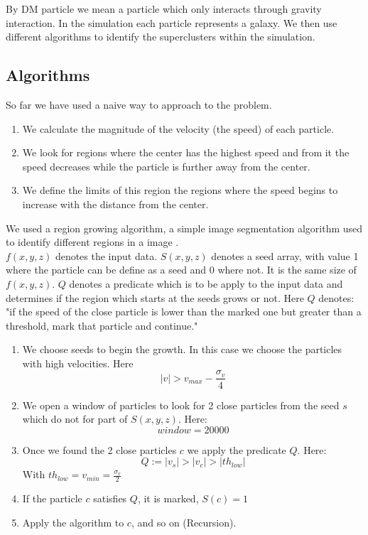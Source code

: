 \documentclass[12pt]{article}
\begin{document}
By DM particle we mean a particle which only interacts through gravity
interaction. In the simulation each particle represents a galaxy. We then use
different algorithms to identify the superclusters within the simulation.\\

\subsection{Algorithms}

So far we have used a naive way to approach to the problem. 
\begin{enumerate}
	\item We calculate the magnitude of the velocity (the speed) of each particle. 
	\item We look for regions where the center has the highest speed and from it the speed decreases while the particle is further away from the center. 
    \item We define the limits of this region the regions where the speed begins to increase with the distance from the center.
\end{enumerate}

We used a region growing algorithm, a simple image segmentation algorithm
used to identify different regions in a image \cite{gonzalez_digital_2008}.\\
$f(x,y,z)$ denotes the input data. $S(x,y,z)$ denotes a seed array, with
value 1 where the particle can be define as a seed and 0 where not. It is the
same size of $f(x,y,z)$. $Q$ denotes a predicate which is to be apply to the
input data and determines if the region which starts at the seeds grows or
not. Here $Q$ denotes: "if the speed of the close particle is lower than the
marked one but greater than a threshold, mark that particle and continue."

\begin{enumerate}
	\item We choose seeds to begin the growth. In this case we choose the particles with high velocities. Here \[ |v|>  v_{max}  - \frac{\sigma_{v}}{4} \]
	\item We open a window of particles to look for 2 close particles from the seed $s$ which do not for part of $S(x,y,z)$. Here:
    \[ window = 20000\]
    \item Once we found the 2 close particles $c$ we apply the predicate $Q$. Here:
    \[ Q := |v_s| > |v_c| > |th_{low}|\]
    With $th_{low} = v_{min} = \frac{\sigma_{v}}{2} $
    \item If the particle $c$ satisfies $Q$, it is marked, $S(c) = 1$
    \item Apply the algorithm to $c$, and so on (Recursion).
\end{enumerate}
\end{document}
